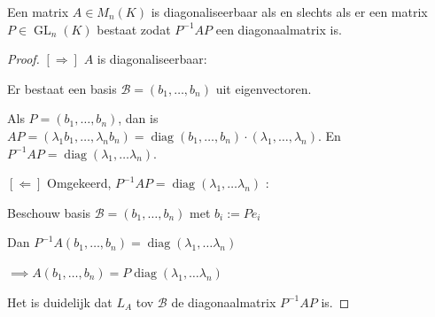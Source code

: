 \begin{lemma}[6.3.3]
    Een matrix $A \in M_n(K)$ is diagonaliseerbaar als en slechts als er een matrix $P \in \operatorname{GL}_n(K)$ bestaat zodat $P^{-1}AP$ een diagonaalmatrix is.
\end{lemma}
\begin{proof}
    \([\Rightarrow]\) \(A\) is diagonaliseerbaar:
    
    Er bestaat een basis \(\mathcal{B} = (b_1, \dots, b_n)\) uit eigenvectoren.

    Als \(P = (b_1, \dots, b_n)\), dan is \(AP = (\lambda_1 b_1, \dots, \lambda_n b_n) = \operatorname{diag}(b_1, \dots, b_n) \cdot (\lambda_1,\dots,\lambda_n)\). 
    En \(P^{-1}AP = \operatorname{diag}(\lambda_1,\dots\lambda_n)\).

    \([\Leftarrow]\) Omgekeerd, \(P^{-1}AP= \operatorname{diag}(\lambda_1,\dots\lambda_n)\) :

    Beschouw basis \(\mathcal{B} = (b_1, \dots, b_n)\) met \(b_i := Pe_i\)

    Dan \(P^{-1}A(b_1, \dots , b_n)= \operatorname{diag}(\lambda_1,\dots\lambda_n)\)

    \(\implies A(b_1, \dots , b_n)= P \operatorname{diag}(\lambda_1,\dots\lambda_n)\)

    Het is duidelijk dat \(L_A \) tov \(\mathcal{B}\) de diagonaalmatrix \(P^{-1}AP\) is.
    
\end{proof}

